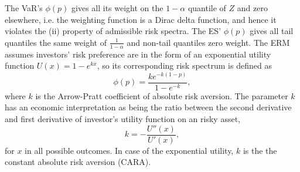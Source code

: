 The VaR's $\phi(p)$ gives all its weight on the $1-\alpha$ quantile of $Z$ and zero elsewhere,
i.e. the weighting function is a Dirac delta function, and hence it
violates the (ii) property of admissible risk spectra. 
The ES' $\phi(p)$ gives all tail quantiles the same weight of
$\displaystyle\frac{1}{1-\alpha}$ and non-tail quantiles zero weight. 
The ERM assumes investors' risk preference are in the form of an
exponential utility function $U(x)=1-e^{kx}$, so its corresponding
risk spectrum is defined as 
\begin{equation}
  \phi(p) =\frac{k e^{-k(1-p)}}{1-e^{-k}} , \label{eq:phi}
\end{equation}
where $k$ is the Arrow-Pratt coefficient of absolute risk aversion. \medskip
The parameter $k$ has an economic interpretation as being the ratio
between the second derivative and first derivative 
of investor's utility function on an risky asset,
\begin{equation*}
  k = -\frac{U''(x)}{U'(x)},
\end{equation*}
for $x$ in all possible outcomes.
In case of the exponential utility, $k$ is the the constant absolute risk aversion (CARA).





